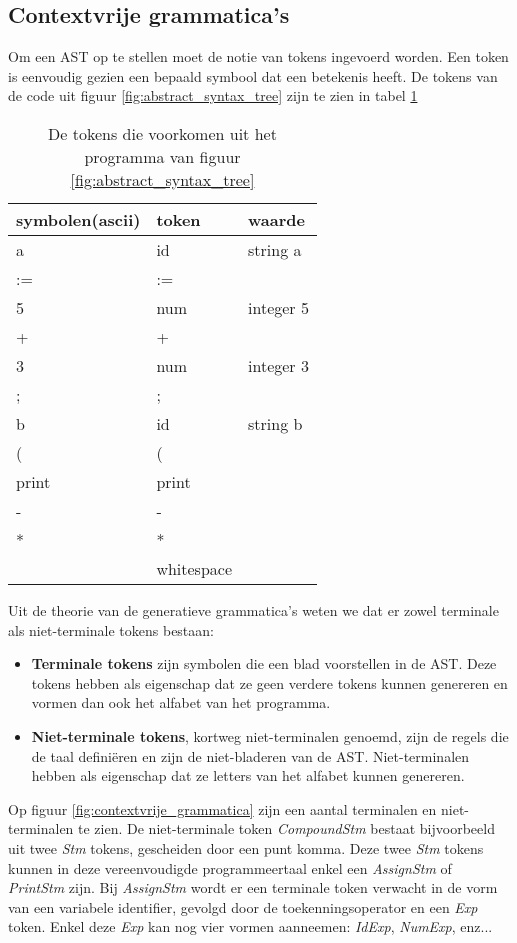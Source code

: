 \subsection{Contextvrije grammatica's}
Om een AST op te stellen moet de notie van tokens ingevoerd worden. Een token is eenvoudig gezien een bepaald symbool dat een betekenis heeft. De tokens van de code uit figuur \ref{fig:abstract_syntax_tree} zijn te zien in tabel \ref{table:tokens}
\begin{table}[h]
	\centering
	\begin{tabular}{l | l | l}
		symbolen(ascii) & token & waarde \\
		\hline
		a & id & string a \\
		:= & := & \\
		5 & num & integer 5 \\
		+ & + & \\
		3 & num & integer 3 \\
		; & ; & \\
		b & id & string b \\
		( & ( & \\
		print & print & \\
		- & - & \\
		* & * & \\
		  & whitespace & \\
	\end{tabular}
	\caption{De tokens die voorkomen uit het programma van figuur \ref{fig:abstract_syntax_tree}}
	\label{table:tokens}
\end{table}
Uit de theorie van de generatieve grammatica's weten we dat er zowel terminale als niet-terminale tokens bestaan:
\begin{itemize}
	\item \textbf{Terminale tokens} zijn symbolen die een blad voorstellen in de AST. Deze tokens hebben als eigenschap dat ze geen verdere tokens kunnen genereren en vormen dan ook het alfabet van het programma.
	\item \textbf{Niet-terminale tokens}, kortweg niet-terminalen genoemd, zijn de regels die de taal definiëren en zijn de niet-bladeren van de AST. Niet-terminalen hebben als eigenschap dat ze letters van het alfabet kunnen genereren.
\end{itemize}
Op figuur \ref{fig:contextvrije_grammatica} zijn een aantal terminalen en niet-terminalen te zien. De niet-terminale token \textit{CompoundStm} bestaat bijvoorbeeld uit twee \textit{Stm} tokens, gescheiden door een punt komma. Deze twee \textit{Stm} tokens kunnen in deze vereenvoudigde programmeertaal enkel een \textit{AssignStm} of \textit{PrintStm} zijn. Bij \textit{AssignStm} wordt er een terminale token verwacht in de vorm van een variabele identifier, gevolgd door de toekenningsoperator en een \textit{Exp} token. Enkel deze \textit{Exp} kan nog vier vormen aanneemen: \textit{IdExp}, \textit{NumExp}, enz...
